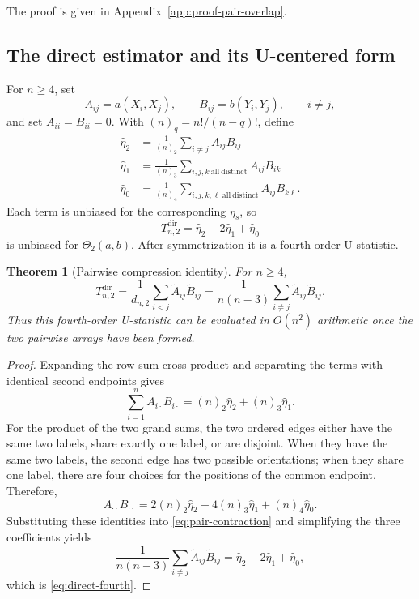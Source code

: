 \documentclass[11pt]{article}
\theoremstyle{plain}
\newtheorem{theorem}{Theorem}[section]
\theoremstyle{definition}
\theoremstyle{remark}
\begin{document}
\noindent The proof is given in
Appendix~\ref{app:proof-pair-overlap}.

\subsection{The direct estimator and its U-centered form}

For $n\ge4$, set
\[
 A_{ij}=a(X_i,X_j),\qquad B_{ij}=b(Y_i,Y_j),\qquad i\ne j,
\]
and set $A_{ii}=B_{ii}=0$.  With $(n)_q=n!/(n-q)!$, define
  \begin{align*}
 \widehat\eta_2
 &=\frac{1}{(n)_2}\sum_{i\ne j}A_{ij}B_{ij}\\
 \widehat\eta_1
 &=\frac{1}{(n)_3}\sum_{i,j,k\ \mathrm{all\ distinct}}
     A_{ij}B_{ik}\\
 \widehat\eta_0
 &=\frac{1}{(n)_4}\sum_{i,j,k,\ell\ \mathrm{all\ distinct}}
     A_{ij}B_{k\ell}.
\end{align*}
Each term is unbiased for the corresponding $\eta_s$, so
\begin{equation}\label{eq:direct-fourth}
 T_{n,2}^{\mathrm{dir}}
 =\widehat\eta_2-2\widehat\eta_1+\widehat\eta_0
\end{equation}
is unbiased for $\Theta_2(a,b)$.  After symmetrization it is a fourth-order
U-statistic.

\begin{theorem}[Pairwise compression identity]
\label{thm:pair-compression}
For $n\ge4$,
\begin{equation}\label{eq:pair-compression}
 T_{n,2}^{\mathrm{dir}}
 =\frac{1}{d_{n,2}}\sum_{i<j}\widetilde A_{ij}\widetilde B_{ij}
 =\frac{1}{n(n-3)}\sum_{i\ne j}\widetilde A_{ij}\widetilde B_{ij}.
\end{equation}
Thus this fourth-order U-statistic can be evaluated in $O(n^2)$ arithmetic once
the two pairwise arrays have been formed.
\end{theorem}

\begin{proof}
Expanding the row-sum cross-product and separating the terms with identical
second endpoints gives
\[
 \sum_{i=1}^n A_{i\cdot}B_{i\cdot}
 =(n)_2\widehat\eta_2+(n)_3\widehat\eta_1.
\]
For the product of the two grand sums, the two ordered edges either have the
same two labels, share exactly one label, or are disjoint.  When they have the
same two labels, the second edge has two possible orientations; when they
share one label, there are four choices for the positions of the common
endpoint.  Therefore,
\[
 A_{\cdot\cdot}B_{\cdot\cdot}
 =2(n)_2\widehat\eta_2
  +4(n)_3\widehat\eta_1
  +(n)_4\widehat\eta_0.
\]
Substituting these identities into \eqref{eq:pair-contraction} and simplifying
the three coefficients yields
\[
 \frac{1}{n(n-3)}
 \sum_{i\ne j}\widetilde A_{ij}\widetilde B_{ij}
 =\widehat\eta_2-2\widehat\eta_1+\widehat\eta_0,
\]
which is \eqref{eq:direct-fourth}.
\end{proof}
\end{document}
